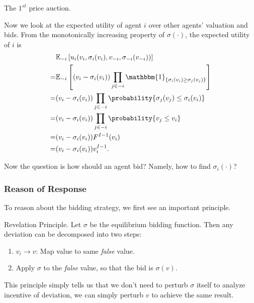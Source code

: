 \begin{prev}
	The \(1^{st}\) price auction.
\end{prev}

Now we look at the expected utility of agent \(i\) over other agents' valuation and bids. From the monotonically increasing property
of \(\sigma(\cdot)\), the expected utility of \(i\) is
\[
	\begin{split}
		&\mathbb{\MakeUppercase{E}}_{-i}\left[u_{i}(v_{i}, \sigma_{i}(v_{i}), v_{-i}, \sigma_{-i}(v_{-i}))\right]\\
		= &\mathbb{\MakeUppercase{E}}_{-i}\left[(v_{i} - \sigma_{i}(v_{i})) \prod\limits_{j\in -i}\mathbbm{1}_{\{ \sigma_{i}(v_{i})\geq \sigma_{j}(v_{j}) \}}  \right]\\
		= &(v_{i} - \sigma_{i}(v_{i}))\prod\limits_{j\in -i}\probability{\sigma_{j}(v_{j})\leq \sigma_{i}(v_{i})}\\
		= &(v_{i} - \sigma_{i}(v_{i}))\prod\limits_{j\in -i}\probability{v_{j}\leq v_{i}}\\
		= &(v_{i} - \sigma_{i}(v_{i}))F^{I-1}(v_{i})\\
		= &(v_{i} - \sigma_{i}(v_{i}))v_{i}^{I-1}.
	\end{split}
\]

\hr

Now the question is how should an agent bid? Namely, how to find \(\sigma_{i}(\cdot)\)?
\subsubsection{Reason of Response}
To reason about the bidding strategy, we first see an important principle.
\begin{theorem}
	\label{Revelation-Principle}
	Revelation Principle. Let \(\sigma\) be the equilibrium bidding function. Then any deviation can be decomposed into two steps:
	\begin{enumerate}
		\item \(v_{i}\to v\): Map value to same \emph{false} value.
		\item Apply \(\sigma\) to the \emph{false} value, so that the bid is \(\sigma(v)\).
	\end{enumerate}
\end{theorem}

\begin{intuition}
	This principle simply tells us that we don't need to perturb \(\sigma\) itself to analyze incentive of deviation, we can simply perturb \(v\) to achieve
	the same result.
\end{intuition}

